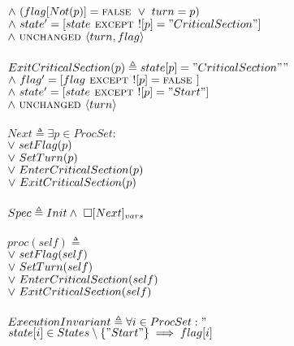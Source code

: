\documentclass[fleqn]{tukseminar}
\begin{document}
			\hspace*{0.8cm}$\land \  (flag[Not(p)] = \mbox{\textsc{false }} \lor \  turn = p)$\\
			\hspace*{0.8cm}$\land \   state' = [state \mbox{\textsc{ except }} ![p] = "CriticalSection"]$\\
			\hspace*{0.8cm}$\land \  \mbox{\textsc{unchanged }} \langle turn, flag \rangle $\\\\
			$ ExitCriticalSection(p) \triangleq state[p] = "CriticalSection""$ \\
			\hspace*{0.8cm}$\land \   flag' = [flag \mbox{\textsc{ except }} ![p] = \mbox{\textsc{false }}]$\\
			\hspace*{0.8cm}$\land \   state' = [state \mbox{\textsc{ except }} ![p] = "Start"]$\\
			\hspace*{0.8cm}$\land \  \mbox{\textsc{unchanged }} \langle turn \rangle $\\\\
			$Next \triangleq \exists p \in ProcSet:$\\
			\hspace*{0.8cm}$ \lor \  setFlag(p)$\\
			\hspace*{0.8cm}$ \lor \  SetTurn(p)$\\
			\hspace*{0.8cm}$ \lor \  EnterCriticalSection(p)$\\
			\hspace*{0.8cm}$ \lor \  ExitCriticalSection(p)$\\\\
			$Spec \triangleq Init \land \  \square [Next]_{vars}$\\\\
			$proc(self) \triangleq$\\
			\hspace*{0.8cm}$ \lor \  setFlag(self)$\\
			\hspace*{0.8cm}$ \lor \  SetTurn(self)$\\
			\hspace*{0.8cm}$ \lor \  EnterCriticalSection(self)$\\
			\hspace*{0.8cm}$ \lor \  ExitCriticalSection(self)$\\\\
			$ ExecutionInvariant \triangleq \forall i \in ProcSet:"$ \\
			\hspace*{0.8cm}$state[i] \in States \setminus  \{"Start"\} \implies flag[i] $\\
\end{document}

